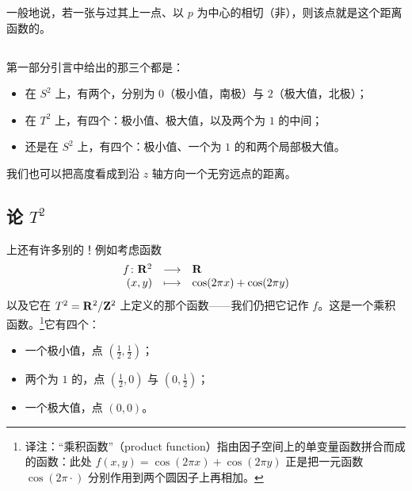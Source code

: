 一般地说，若一张\trSubmanifold{}与过其上一点、以 $p$ 为中心的\trSphere{}相切（非\trTransverse），则该点就是这个距离函数的\trCriticalPoint。

\subsection{\trHeightFunction}
\label{subsec:three-height-functions}

第一部分引言中给出的那三个\trHeightFunction{}都是\trMorseFunction：
\begin{itemize}
\item 在\trSphere{} $S^2$ 上，有两个\trCriticalPoint，\trIndex{}分别为 $0$（极小值，南极）与 $2$（极大值，北极）；
\item 在\trTorus{} $T^2$ 上，有四个\trCriticalPoint：极小值、极大值，以及两个\trIndex{}为 $1$ 的中间\trCriticalPoint；
\item 还是在\trSphere{} $S^2$ 上，有四个\trCriticalPoint：极小值、一个\trIndex{}为 $1$ 的\trCriticalPoint{}和两个局部极大值。
\end{itemize}

\begin{remark}\label{thm:height-distance-infinity}
我们也可以把高度看成到沿 $z$ 轴方向一个无穷远点的距离。
\end{remark}

\subsection{论\trTorus{} $T^2$}
\label{subsec:on-the-torus-t2}

\trTorus{}上还有许多别的\trMorseFunction！例如考虑函数
\[
\begin{array}{rcl}
f\colon\mathbf{R}^2 & \longrightarrow & \mathbf{R}\\
(x,y) & \longmapsto & \cos(2\pi x)+\cos(2\pi y)
\end{array}
\]
以及它在\trTorus{} $T^2=\mathbf{R}^2/\mathbf{Z}^2$ 上定义的那个函数——我们仍把它记作 $f$。这是一个乘积函数。\footnote{译注：“乘积函数”（product function）指由因子空间上的单变量函数拼合而成的函数：此处 $f(x,y)=\cos(2\pi x)+\cos(2\pi y)$ 正是把一元函数 $\cos(2\pi\cdot)$ 分别作用到两个圆因子上再相加。}它有四个\trCriticalPoint：
\begin{itemize}
\item 一个极小值，点 $(\frac{1}{2},\frac{1}{2})$；
\item 两个\trIndex{}为 $1$ 的\trCriticalPoint，点 $(\frac{1}{2},0)$ 与 $(0,\frac{1}{2})$；
\item 一个极大值，点 $(0,0)$。
\end{itemize}

